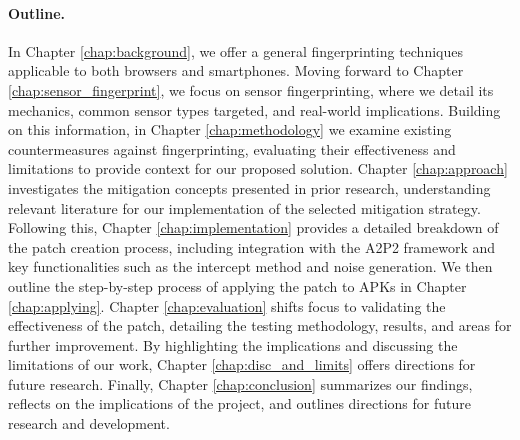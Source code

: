 \documentclass[11pt,
  oneside,openany,    %
]{scrreprt}
\begin{document}
\paragraph{Outline.}
In Chapter \ref{chap:background}, we offer a general fingerprinting techniques applicable to both browsers and smartphones. 
Moving forward to Chapter \ref{chap:sensor_fingerprint}, we focus on sensor fingerprinting, where we detail its mechanics, common sensor types targeted, and real-world implications.
Building on this information, in Chapter \ref{chap:methodology} we examine existing countermeasures against fingerprinting, evaluating their effectiveness and limitations to provide context for our proposed solution. 
Chapter \ref{chap:approach} investigates the mitigation concepts presented in prior research, understanding relevant literature for our implementation of the selected mitigation strategy.
Following this, Chapter \ref{chap:implementation} provides a detailed breakdown of the patch creation process, including integration with the A2P2 framework and key functionalities such as the intercept method and noise generation. 
We then outline the step-by-step process of applying the patch to APKs in Chapter \ref{chap:applying}. 
Chapter \ref{chap:evaluation} shifts focus to validating the effectiveness of the patch, detailing the testing methodology, results, and areas for further improvement. 
By highlighting the implications and discussing the limitations of our work, Chapter \ref{chap:disc_and_limits} offers directions for future research.
Finally, Chapter \ref{chap:conclusion} summarizes our findings, reflects on the implications of the project, and outlines directions for future research and development.

\end{document}
